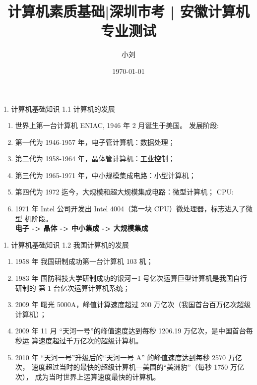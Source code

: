 \documentclass[aspectratio=169]{beamer}
\begin{document}
%
%

\title{计算机素质基础|深圳市考 | 安徽计算机专业测试}
\author{小刘}
\date{\today}




\begin{frame}
\titlepage
\end{frame}

\begin{frame}[t]{1. 计算机基础知识} \vspace{20pt}
    1.1 计算机的发展

    \begin{enumerate}
        \item{世界上第一台计算机 ENIAC, 1946 年 2 月诞生于美国。}
            发展阶段:
        \item{第一代为 1946-1957 年，电子管计算机：数据处理；}
        \item{第二代为 1958-1964 年，晶体管计算机：工业控制；}
        \item{第三代为 1965-1971 年，中小规模集成电路：小型计算机；}
        \item{第四代为 1972 迄今，大规模和超大规模集成电路：微型计算机；}
            CPU:
        \item{1971 年 Intel 公司开发出 Intel 4004（第一块 CPU）微处理器，标志进入了微型
机阶段。}\\
\textbf{电子 -> 晶体 -> 中小集成 -> 大规模集成}

    \end{enumerate}

\end{frame}


\begin{frame}[t]{1. 计算机基础知识} \vspace{20pt}
    1.2 我国计算机的发展

    \begin{enumerate}
        \item{1958 年 我国研制成功第一台计算机 103 机；}
        \item {1983 年 国防科技大学研制成功的银河－I 号亿次运算巨型计算机是我国自行研制的
第 1 台亿次运算计算机系统；
}
        \item {2009 年 曙光 5000A，峰值计算速度超过 200 万亿次（我国首台百万亿次超级计算机）；}
        \item {2009 年 11 月 “天河一号”的峰值速度达到每秒 1206.19 万亿次，是中国首台每秒运
算速度超过千万亿次的超级计算机。
}
        \item {2010 年 “天河一号”升级后的“天河一号 A” 的峰值速度达到每秒 2570 万亿次，
速度超过当时的最快的超级计算机—美国的“美洲豹”（每秒 1750 万亿次），
成为当时世界上运算速度最快的计算机。}
    \end{enumerate}

\end{frame}
\end{document}
